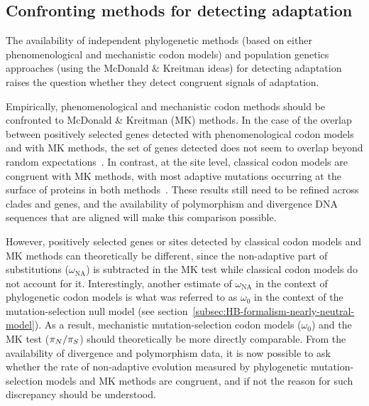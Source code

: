 \subsection{Confronting methods for detecting adaptation}
\label{subsec:confronting-methods-for-detecting-adaptation}

The availability of independent phylogenetic methods (based on either phenomenological and mechanistic codon models) and population genetics approaches (using the McDonald \& Kreitman ideas) for detecting adaptation raises the question whether they detect congruent signals of adaptation.

Empirically, phenomenological and mechanistic codon methods should be confronted to McDonald \& Kreitman (\acrshort{MK}) methods.
In the case of the overlap between positively selected genes detected with phenomenological codon models and with \acrshort{MK} methods, the set of genes detected does not seem to overlap beyond random expectations~\citep{He2020}.
In contrast, at the site level, classical codon models are congruent with \acrshort{MK} methods, with most adaptive mutations occurring at the surface of proteins in both methods~\citep{Moutinho2019}.
These results still need to be refined across clades and genes, and the availability of polymorphism and divergence \acrshort{DNA} sequences that are aligned will make this comparison possible.

However, positively selected genes or sites detected by classical codon models and \acrshort{MK} methods can theoretically be different, since the non-adaptive part of substitutions ($\omega_{\text{NA}}$) is subtracted in the \acrshort{MK} test while classical codon models do not account for it.
Interestingly, another estimate of $\omega_{\text{NA}}$ in the context of phylogenetic codon models is what was referred to as $\omega_0$ in the context of the mutation-selection null model (see section~\ref{subsec:HB-formalism-nearly-neutral-model}).
As a result, mechanistic mutation-selection codon models ($\omega_0$) and the \acrshort{MK} test ($\pi_N / \pi_S$) should theoretically be more directly comparable.
From the availability of divergence and polymorphism data, it is now possible to ask whether the rate of non-adaptive evolution measured by phylogenetic mutation-selection models and \acrshort{MK} methods are congruent, and if not the reason for such discrepancy should be understood.

